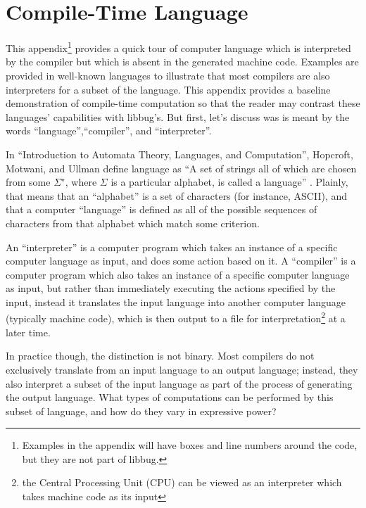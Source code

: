 
\appendix
 \appendixpage
 \noappendicestocpagenum
 \chapter{Compile-Time Language}
  \label{sec:appendix1}
 This appendix\footnote{Examples in the appendix will have boxes
 and line numbers around the code, but they are not part of libbug.}
 provides a quick tour of computer language which is interpreted
 by the compiler but which is absent in the generated machine
 code.  Examples are provided in
 well-known languages to illustrate that
 most compilers are also interpreters for a subset of the language.  This
 appendix provides a baseline demonstration of compile-time computation
 so that the reader may contrast these languages' capabilities with libbug's.
 But first, let's discuss was is meant by the words ``language'',``compiler'', and
 ``interpreter''.

 In ``Introduction to Automata Theory, Languages, and Computation'', Hopcroft,
 Motwani, and Ullman define language as ``A set of strings all of which are chosen
 from some $\Sigma^{\star}$, where $\Sigma$ is a particular alphabet, is called
 a language'' \cite[p. 30]{hmu2001}.
 Plainly, that means that an ``alphabet'' is a set of characters (for instance, ASCII), and
 that a computer ``language'' is defined as all of the possible sequences of characters
 from that alphabet which match some criterion.

 An ``interpreter'' is a computer program which takes an instance of a specific
 computer language as input,
 and does some action based on it.  A ``compiler'' is a computer program
 which also takes an instance of a specific computer language as input,
 but rather than immediately executing the actions specified by the input, instead it
 translates the input language
 into another computer language (typically machine code), which is then output to a file
 for interpretation\footnote{the Central Processing Unit (CPU) can be viewed as an
 interpreter which takes machine code as its input} at a later time.

 In practice though, the distinction is not binary.  Most compilers do not exclusively
 translate from an input language
 to an output language; instead, they also interpret a subset of the input
 language as part of the process of generating the output language.  What
 types of computations can be performed by this subset of language, and how do
 they vary in expressive power?


